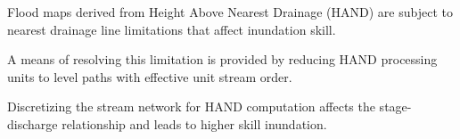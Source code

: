 \documentclass[draft]{dependencies/agujournal2019}
\begin{document}
%
%
 



%
\begin{keypoints}
\item Flood maps derived from Height Above Nearest Drainage (HAND) are subject to nearest drainage line limitations that affect inundation skill.
\item A means of resolving this limitation is provided by reducing HAND processing units to level paths with effective unit stream order.
\item Discretizing the stream network for HAND computation affects the stage-discharge relationship and leads to higher skill inundation.
\end{keypoints}
%
 

%
%

%
%
\end{document}
